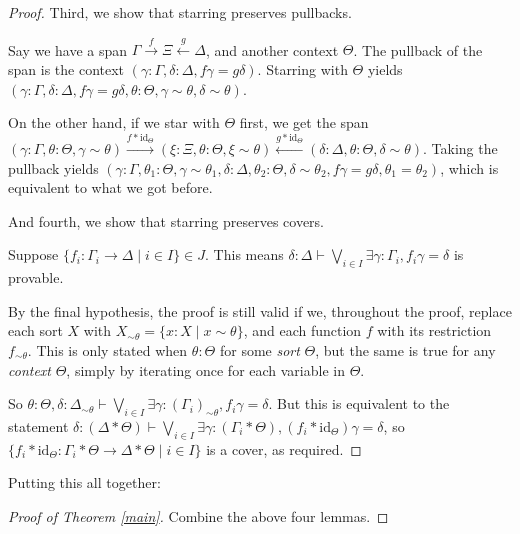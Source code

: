 \documentclass{article}
\begin{document}
\begin{proof}
    Third, we show that starring preserves pullbacks.
    
    Say we have a span \(\Gamma \xrightarrow{f} \Xi \xleftarrow{g} \Delta\), and another context \(\Theta\).
    The pullback of the span is the context \((\gamma : \Gamma, \delta : \Delta, f\gamma = g\delta)\).
    Starring with \(\Theta\) yields \((\gamma : \Gamma, \delta : \Delta, f\gamma = g\delta, \theta : \Theta, \gamma \sim \theta, \delta \sim \theta)\).
    
    On the other hand, if we star with \(\Theta\) first, we get the span
    \((\gamma : \Gamma, \theta : \Theta, \gamma \sim \theta) \xrightarrow{f * \mathrm{id}_\Theta} (\xi : \Xi, \theta : \Theta, \xi \sim \theta) \xleftarrow{g * \mathrm{id}_\Theta} (\delta : \Delta, \theta : \Theta, \delta \sim \theta)\).
    Taking the pullback yields \((\gamma : \Gamma, \theta_1 : \Theta, \gamma \sim \theta_1, \delta : \Delta, \theta_2 : \Theta, \delta \sim \theta_2, f\gamma = g\delta, \theta_1 = \theta_2)\),
    which is equivalent to what we got before.

    And fourth, we show that starring preserves covers.
    
    Suppose \(\{f_i : \Gamma_i \to \Delta \mid i \in I\} \in J\).
    This means \(\delta : \Delta \vdash \bigvee_{i \in I} \exists \gamma : \Gamma_i, f_i\gamma = \delta\) is provable.

    By the final hypothesis, the proof is still valid if we, throughout the proof, replace each sort \(X\) with \(X_{\sim \theta} = \{x : X \mid x \sim \theta\}\), and each function \(f\) with its restriction \(f_{\sim \theta}\).
    This is only stated when \(\theta : \Theta\) for some \emph{sort} \(\Theta\),
    but the same is true for any \emph{context} \(\Theta\),
    simply by iterating once for each variable in \(\Theta\).

    So \(\theta : \Theta, \delta : \Delta_{\sim \theta} \vdash \bigvee_{i \in I} \exists \gamma : (\Gamma_i)_{\sim \theta}, f_i\gamma = \delta\).
    But this is equivalent to the statement \(\delta : (\Delta * \Theta) \vdash \bigvee_{i \in I} \exists \gamma : (\Gamma_i * \Theta), (f_i * \mathrm{id}_\Theta)\gamma = \delta\),
    so \(\{f_i * \mathrm{id}_\Theta : \Gamma_i * \Theta \to \Delta * \Theta \mid i \in I\}\) is a cover, as required.
\end{proof}

Putting this all together:

\begin{proof}[Proof of Theorem \ref{main}]
    Combine the above four lemmas.
\end{proof}

\printbibliography
\end{document}
